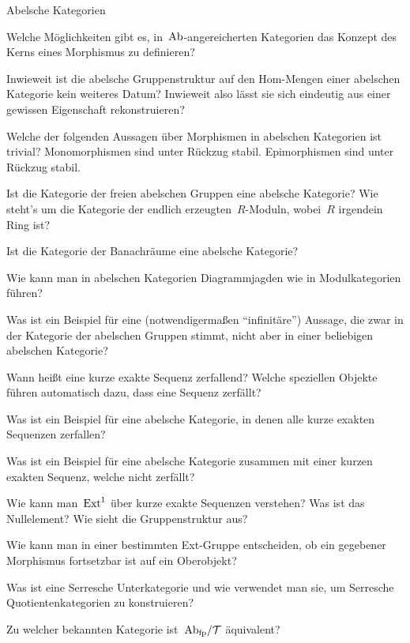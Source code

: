 \documentclass{uebblatt}
\begin{document}
\begin{aufgabeE}{Abelsche Kategorien}
\item Welche Möglichkeiten gibt es, in~$\mathrm{Ab}$-angereicherten Kategorien das Konzept
des Kerns eines Morphismus zu definieren?
\item Inwieweit ist die abelsche Gruppenstruktur auf den Hom-Mengen einer
abelschen Kategorie kein weiteres Datum? Inwieweit also lässt sie sich
eindeutig aus einer gewissen Eigenschaft rekonstruieren?
\item Welche der folgenden Aussagen über Morphismen in abelschen Kategorien ist
trivial? Monomorphismen sind unter Rückzug stabil. Epimorphismen sind unter
Rückzug stabil.
\item Ist die Kategorie der freien abelschen Gruppen eine abelsche Kategorie?
Wie steht's um die Kategorie der endlich erzeugten~$R$-Moduln, wobei~$R$
irgendein Ring ist?
\item Ist die Kategorie der Banachräume eine abelsche Kategorie?
\item Wie kann man in abelschen Kategorien Diagrammjagden wie in
Modulkategorien führen?
\item Was ist ein Beispiel für eine (notwendigermaßen "`infinitäre"') Aussage,
die zwar in der Kategorie der abelschen Gruppen stimmt, nicht aber in einer
beliebigen abelschen Kategorie?
\item Wann heißt eine kurze exakte Sequenz zerfallend? Welche speziellen
Objekte führen automatisch dazu, dass eine Sequenz zerfällt?
\item Was ist ein Beispiel für eine abelsche Kategorie, in denen alle kurze
exakten Sequenzen zerfallen?
\item Was ist ein Beispiel für eine abelsche Kategorie zusammen mit einer
kurzen exakten Sequenz, welche nicht zerfällt?
\item Wie kann man~$\mathrm{Ext}^1$ über kurze exakte Sequenzen verstehen? Was ist das
Nullelement? Wie sieht die Gruppenstruktur aus?
\item Wie kann man in einer bestimmten Ext-Gruppe entscheiden, ob ein gegebener
Morphismus fortsetzbar ist auf ein Oberobjekt?
\item Was ist eine Serresche Unterkategorie und wie verwendet man sie, um
Serresche Quotientenkategorien zu konstruieren?
\item Zu welcher bekannten Kategorie ist~$\mathrm{Ab}_\text{fp}/\mathcal{T}$ äquivalent?
\end{aufgabeE}
\end{document}
